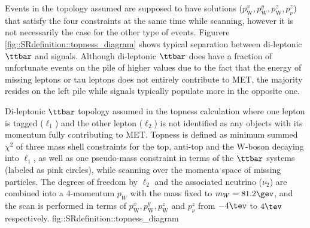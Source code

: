 Events in the topology assumed are supposed to have solutions ($p_{\mathrm{W}}^x, p_{\mathrm{W}}^y, p_{\mathrm{W}}^z, p_{\nu}^z$) that satisfy the four constraints at the same time while scanning, however it is not necessarily the case for the other type of events. Figurere \ref{fig::SRdefinition::topness_diagram} shows typical separation between di-leptonic $\ttbar$ and signals. Although di-leptonic $\ttbar$ does have a fraction of unfortunate events on the pile of higher values due to the fact that the energy of missing leptons or tau leptons does not entirely contribute to MET, the majority resides on the left pile while signals typically populate  more in the opposite one. 

{Di-leptonic $\ttbar$ topology assumed in the topness calculation where one lepton is tagged ($\ell_1$) and the other lepton ($\ell_2$) is not identified as any objects with its momentum fully contributing to MET. Topness is defined as minimum summed $\chi^2$ of three mass shell constraints for the top, anti-top and the W-boson decaying into $\ell_1$, as well as one pseudo-mass constraint in terms of the $\ttbar$ systems (labeled as pink circles), while scanning over the momenta space of missing particles. The degrees of freedom by $\ell_2$ and the associated neutrino ($\nu_2$) are combined into a 4-momentum $p_W$ with the mass fixed to $m_W = 81.2\gev$, and the scan is performed in terms of $p_{\mathrm{W}}^x, p_{\mathrm{W}}^y, p_{\mathrm{W}}^z$ and $p_{\nu}^z$ from $-4\tev$ to $4\tev$ respectively.}
{fig::SRdefinition::topness_diagram}

